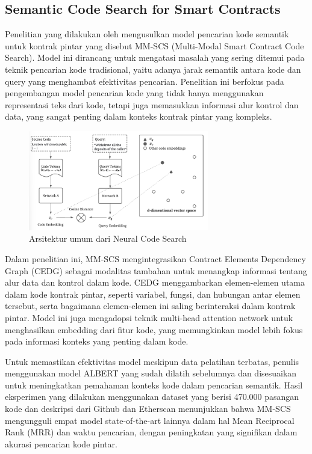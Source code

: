 \subsection{Semantic Code Search for Smart Contracts}
\label{subsec:semantic-code-search}

Penelitian yang dilakukan oleh \cite{shi2021semantic} mengusulkan model pencarian kode semantik untuk kontrak pintar yang disebut MM-SCS (Multi-Modal Smart Contract Code Search). Model ini dirancang untuk mengatasi masalah yang sering ditemui pada teknik pencarian kode tradisional, yaitu adanya jarak semantik antara kode dan query yang menghambat efektivitas pencarian. Penelitian ini berfokus pada pengembangan model pencarian kode yang tidak hanya menggunakan representasi teks dari kode, tetapi juga memasukkan informasi alur kontrol dan data, yang sangat penting dalam konteks kontrak pintar yang kompleks.

\begin{figure}[ht]
  \centering
  \includegraphics[width=0.7\textwidth]{resources/chapter-2/architecture-code-search.png}
  \caption{Arsitektur umum dari Neural Code Search \parencite{shi2021semantic}}
  \label{image:architecture-code-search}
\end{figure}

Dalam penelitian ini, MM-SCS mengintegrasikan Contract Elements Dependency Graph (CEDG) sebagai modalitas tambahan untuk menangkap informasi tentang alur data dan kontrol dalam kode. CEDG menggambarkan elemen-elemen utama dalam kode kontrak pintar, seperti variabel, fungsi, dan hubungan antar elemen tersebut, serta bagaimana elemen-elemen ini saling berinteraksi dalam kontrak pintar. Model ini juga mengadopsi teknik multi-head attention network untuk menghasilkan embedding dari fitur kode, yang memungkinkan model lebih fokus pada informasi konteks yang penting dalam kode.

Untuk memastikan efektivitas model meskipun data pelatihan terbatas, penulis menggunakan model ALBERT yang sudah dilatih sebelumnya dan disesuaikan untuk meningkatkan pemahaman konteks kode dalam pencarian semantik. Hasil eksperimen yang dilakukan menggunakan dataset yang berisi 470.000 pasangan kode dan deskripsi dari Github dan Etherscan menunjukkan bahwa MM-SCS mengungguli empat model state-of-the-art lainnya dalam hal Mean Reciprocal Rank (MRR) dan waktu pencarian, dengan peningkatan yang signifikan dalam akurasi pencarian kode pintar.

